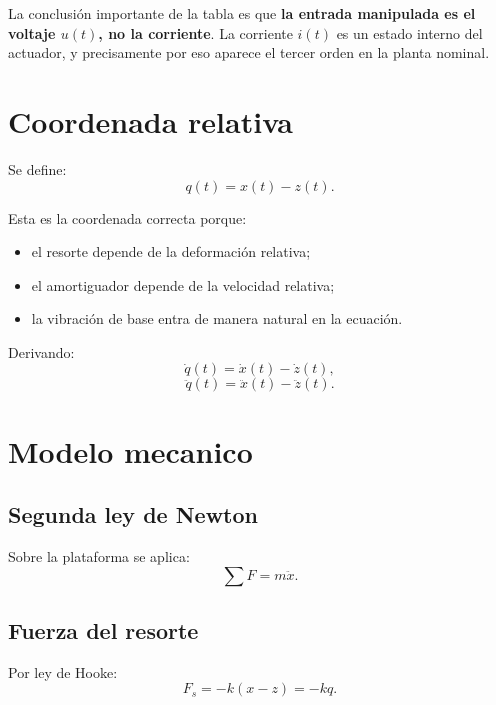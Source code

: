 \documentclass[11pt]{article}
\begin{document}
La conclusi\'on importante de la tabla es que \textbf{la entrada manipulada es el voltaje $u(t)$, no la corriente}. La corriente $i(t)$ es un estado interno del actuador, y precisamente por eso aparece el tercer orden en la planta nominal.

\section{Coordenada relativa}

Se define:
\begin{equation}
q(t)=x(t)-z(t).
\label{eq:qdef}
\end{equation}

Esta es la coordenada correcta porque:

\begin{itemize}[leftmargin=1.2cm]
\item el resorte depende de la deformaci\'on relativa;
\item el amortiguador depende de la velocidad relativa;
\item la vibraci\'on de base entra de manera natural en la ecuaci\'on.
\end{itemize}

Derivando:
\begin{equation}
\dot q(t)=\dot x(t)-\dot z(t),
\end{equation}
\begin{equation}
\ddot q(t)=\ddot x(t)-\ddot z(t).
\end{equation}

\section{Modelo mecanico}

\subsection{Segunda ley de Newton}

Sobre la plataforma se aplica:
\begin{equation}
\sum F = m\ddot x.
\label{eq:newton}
\end{equation}

\subsection{Fuerza del resorte}

Por ley de Hooke:
\begin{equation}
F_s = -k(x-z) = -kq.
\label{eq:hooke}
\end{equation}
\end{document}
